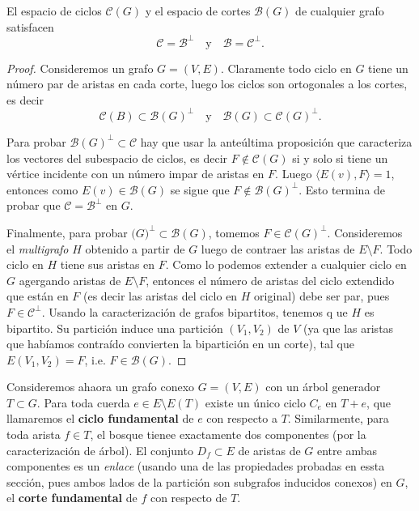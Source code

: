 \documentclass[../main.tex]{subfiles}
\begin{document}
\begin{theorem}\label{th:apendice subespacio de ciclos y subespacio de cortes son mutuamente ortogonales entre si}
El espacio de ciclos $\mathcal{C}(G)$ y el espacio de cortes $\mathcal{B}(G)$ de cualquier grafo satisfacen
\[
    \mathcal C = \mathcal B^{\perp} \quad \text{y} \quad \mathcal B = \mathcal C^{\perp}.
\]
\end{theorem}
\begin{proof}
Consideremos un grafo $G = (V,E)$. Claramente todo ciclo en $G$ tiene un número par de aristas en cada corte, luego los ciclos son ortogonales a los cortes, es decir
$$
\mathcal{C}(B) \subset \mathcal{B}(G)^\perp \quad \text{y} \quad \mathcal B (G)  \subset \mathcal{C}(G)^\perp.
$$

Para probar $\mathcal{B}(G)^\perp \subset \mathcal C$ hay que usar la anteúltima proposición que caracteriza los vectores del subespacio de ciclos, es decir $F \not \in \mathcal{C}(G)$ si y solo si tiene un vértice incidente con un número impar de aristas en $F$. Luego $\langle E(v), F \rangle = 1$, entonces como $E(v) \in \mathcal{B}(G)$ se sigue que $F \not \in \mathcal{B}(G)^\perp$. Esto termina de probar que $\mathcal C = \mathcal B ^\perp$ en $G$.

Finalmente, para probar $\mathcal (G)^\perp \subset \mathcal B (G)$, tomemos $F \in \mathcal C (G)^\perp$. Consideremos el \textit{multigrafo} $H$ obtenido a partir de $G$ luego de contraer las aristas de $E \setminus F$. Todo ciclo en $H$ tiene sus aristas en $F$. Como lo podemos extender a cualquier ciclo en $G$ agergando aristas de $E\setminus F$, entonces el número de aristas del ciclo extendido que están en $F$ (es decir las aristas del ciclo en $H$ original) debe ser par, pues $F \in \mathcal C ^\perp$. Usando la caracterización de grafos bipartitos, tenemos q ue $H$ es bipartito. Su partición induce una partición $(V_1,V_2)$ de $V$ (ya que las aristas que habíamos contraído convierten la bipartición en un corte), tal que $E(V_1,V_2) = F$, i.e. $F \in \mathcal{B}(G)$.
\end{proof}



Consideremos ahaora un grafo conexo $G = (V,E)$ con un árbol generador $T \subset G$. Para toda cuerda $e \in E \setminus E(T)$ existe un único ciclo $C_e$ en $T+e$, que llamaremos el \textbf{ciclo fundamental} de $e$ con respecto a $T$. Similarmente, para toda arista $f \in T$, el bosque tienee exactamente dos componentes (por la caracterización de árbol). El conjunto $D_f \subset E$ de aristas de $G$ entre ambas componentes es un \textit{enlace} (usando una de las propiedades probadas en essta sección, pues ambos lados de la partición son subgrafos inducidos conexos) en $G$, el \textbf{corte fundamental} de $f$ con respecto de $T$.
\end{document}
